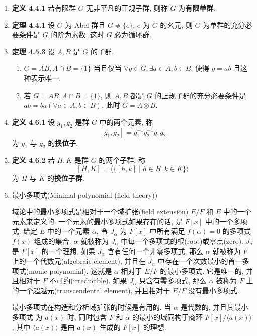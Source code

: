 \documentclass{ctexart}
\begin{document}
\begin{enumerate}
\item \textbf{定义 4.4.1} 若有限群 $G$ 无非平凡的正规子群, 则称 $G$ 为\textbf{有限单群}.

\item \textbf{定理 4.4.1} 设 $G$ 为 Abel 群且 $G\neq\{e\}$, $e$ 为 $G$ 的幺元, 则 $G$ 为单群的充分必要条件是 $G$ 的阶为素数. 这时 $G$ 必为循环群.

\item \textbf{定理 4.5.3} 设 $A,B$ 是 $G$ 的子群.
\begin{enumerate}
  \item $G=AB,A\cap B=\{1\}$ 当且仅当 $\forall g\in G, \exists a\in A,b\in B$, 使得 $g=ab$ 且这种表示唯一.
  \item 若 $G=AB, A\cap B=\{1\}$, 则 $A,B$ 都是 $G$ 的正规子群的充分必要条件是 $ab=ba(\forall a\in A,b\in B)$, 此时 $G=A\otimes B$.
\end{enumerate}

\item \textbf{定义 4.6.1} 设 $g_1,g_2$ 是群 $G$ 中的两个元素, 称
\[
[g_1,g_2] = g_1^{-1}g_2^{-1}g_1g_2
\]
为 $g_1$ 与 $g_2$ 的\textbf{换位子}.

\item \textbf{定义 4.6.2} 若 $H,K$ 是群 $G$ 的两个子群, 称
\[
[H,K] = \langle\{[h,k]\mid h\in H,k\in K\}\rangle
\]
为 $H$ 与 $K$ 的\textbf{换位子群}.

\item 最小多项式(Minimal polynomial (field theory))

域论中的最小多项式是相对于一个域扩张(field extension) $E/F$ 和 $E$ 中的一个元素来定义的. 一个元素的最小多项式如果存在的话, 是 $F[x]$ 中的一个多项式. 给定 $E$ 中的一个元素 $\alpha$, 令 $J_\alpha$ 为 $F[x]$ 中所有满足 $f(\alpha) = 0$ 的多项式 $f(x)$ 组成的集合. $\alpha$ 就被称为 $J_\alpha$ 中每一个多项式的根(root)或零点(zero). $J_\alpha$ 是 $F[x]$ 的一个理想. 如果 $J_\alpha$ 含有任何一个非零多项式, 那么 $\alpha$ 就被称为 $F$ 上的一个代数元(algebraic element), 并且在 $J_\alpha$ 中存在一个次数最小的首一多项式(monic polynomial). 这就是 $\alpha$ 相对于 $E/F$ 的最小多项式. 它是唯一的, 并且相对于 $F$ 不可约(irreducible). 如果 $J_\alpha$ 只含有零多项式, 那么 $\alpha$ 被称为 $F$ 上的一个超越元(transcendental element), 并且相对于 $E/F$ 没有最小多项式.

最小多项式在构造和分析域扩张的时候是有用的. 当 $\alpha$ 是代数的, 并且其最小多项式 为 $a(x)$ 时, 同时包含 $F$ 和 $\alpha$ 的最小的域同构于商环 $F[x]/\langle a(x)\rangle$, 其中 $\langle a(x)\rangle$ 是由 $a(x)$ 生成的 $F[x]$ 的理想.


\end{enumerate}
\end{document}

